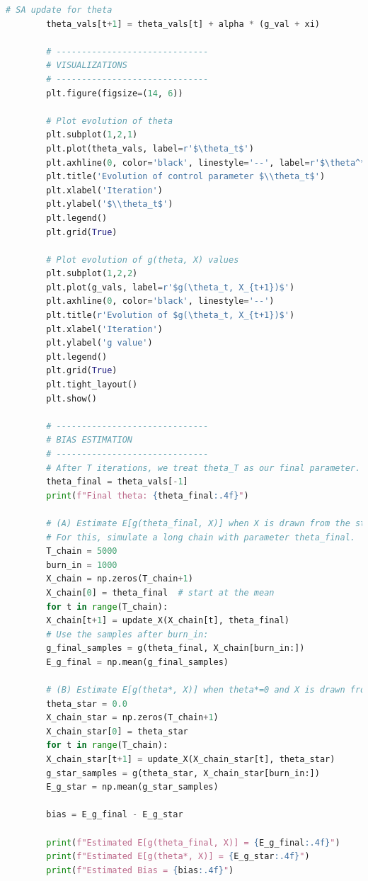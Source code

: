 \documentclass[a4paper]{article}
\begin{document}
\begin{lstlisting}[language=Python, caption=Stochastic Approximation with Bias Tracking]
	 	# SA update for theta
	 	theta_vals[t+1] = theta_vals[t] + alpha * (g_val + xi)
	 	
	 	# ------------------------------
	 	# VISUALIZATIONS
	 	# ------------------------------
	 	plt.figure(figsize=(14, 6))
	 	
	 	# Plot evolution of theta
	 	plt.subplot(1,2,1)
	 	plt.plot(theta_vals, label=r'$\theta_t$')
	 	plt.axhline(0, color='black', linestyle='--', label=r'$\theta^*=0$')
	 	plt.title('Evolution of control parameter $\\theta_t$')
	 	plt.xlabel('Iteration')
	 	plt.ylabel('$\\theta_t$')
	 	plt.legend()
	 	plt.grid(True)
	 	
	 	# Plot evolution of g(theta, X) values
	 	plt.subplot(1,2,2)
	 	plt.plot(g_vals, label=r'$g(\theta_t, X_{t+1})$')
	 	plt.axhline(0, color='black', linestyle='--')
	 	plt.title(r'Evolution of $g(\theta_t, X_{t+1})$')
	 	plt.xlabel('Iteration')
	 	plt.ylabel('g value')
	 	plt.legend()
	 	plt.grid(True)
	 	plt.tight_layout()
	 	plt.show()
	 	
	 	# ------------------------------
	 	# BIAS ESTIMATION
	 	# ------------------------------
	 	# After T iterations, we treat theta_T as our final parameter.
	 	theta_final = theta_vals[-1]
	 	print(f"Final theta: {theta_final:.4f}")
	 	
	 	# (A) Estimate E[g(theta_final, X)] when X is drawn from the stationary chain with parameter theta_final.
	 	# For this, simulate a long chain with parameter theta_final.
	 	T_chain = 5000
	 	burn_in = 1000
	 	X_chain = np.zeros(T_chain+1)
	 	X_chain[0] = theta_final  # start at the mean
	 	for t in range(T_chain):
	 	X_chain[t+1] = update_X(X_chain[t], theta_final)
	 	# Use the samples after burn_in:
	 	g_final_samples = g(theta_final, X_chain[burn_in:])
	 	E_g_final = np.mean(g_final_samples)
	 	
	 	# (B) Estimate E[g(theta*, X)] when theta*=0 and X is drawn from the corresponding stationary distribution.
	 	theta_star = 0.0
	 	X_chain_star = np.zeros(T_chain+1)
	 	X_chain_star[0] = theta_star
	 	for t in range(T_chain):
	 	X_chain_star[t+1] = update_X(X_chain_star[t], theta_star)
	 	g_star_samples = g(theta_star, X_chain_star[burn_in:])
	 	E_g_star = np.mean(g_star_samples)
	 	
	 	bias = E_g_final - E_g_star
	 	
	 	print(f"Estimated E[g(theta_final, X)] = {E_g_final:.4f}")
	 	print(f"Estimated E[g(theta*, X)] = {E_g_star:.4f}")
	 	print(f"Estimated Bias = {bias:.4f}")
	 	
	 	
	 \end{lstlisting}
	 
\end{document}
